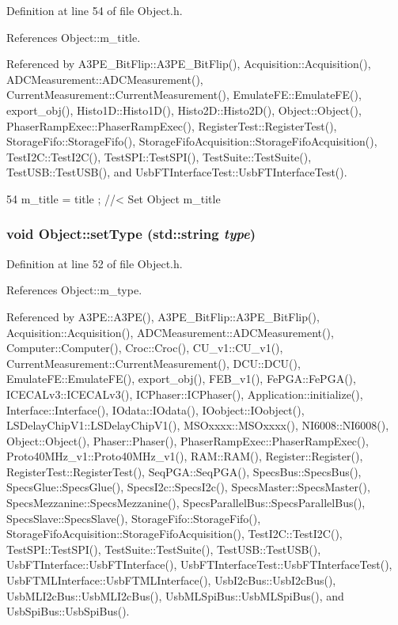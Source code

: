 Definition at line 54 of file Object.h.

References Object::m\_\-title.

Referenced by A3PE\_\-BitFlip::A3PE\_\-BitFlip(), Acquisition::Acquisition(), ADCMeasurement::ADCMeasurement(), CurrentMeasurement::CurrentMeasurement(), EmulateFE::EmulateFE(), export\_\-obj(), Histo1D::Histo1D(), Histo2D::Histo2D(), Object::Object(), PhaserRampExec::PhaserRampExec(), RegisterTest::RegisterTest(), StorageFifo::StorageFifo(), StorageFifoAcquisition::StorageFifoAcquisition(), TestI2C::TestI2C(), TestSPI::TestSPI(), TestSuite::TestSuite(), TestUSB::TestUSB(), and UsbFTInterfaceTest::UsbFTInterfaceTest().


\begin{DoxyCode}
54 { m_title = title ; } //< Set Object m_title
\end{DoxyCode}
\hypertarget{classObject_aae534cc9d982bcb9b99fd505f2e103a5}{
\subsubsection[{setType}]{\setlength{\rightskip}{0pt plus 5cm}void Object::setType (std::string {\em type})}}
\label{classObject_aae534cc9d982bcb9b99fd505f2e103a5}


Definition at line 52 of file Object.h.

References Object::m\_\-type.

Referenced by A3PE::A3PE(), A3PE\_\-BitFlip::A3PE\_\-BitFlip(), Acquisition::Acquisition(), ADCMeasurement::ADCMeasurement(), Computer::Computer(), Croc::Croc(), CU\_\-v1::CU\_\-v1(), CurrentMeasurement::CurrentMeasurement(), DCU::DCU(), EmulateFE::EmulateFE(), export\_\-obj(), FEB\_\-v1(), FePGA::FePGA(), ICECALv3::ICECALv3(), ICPhaser::ICPhaser(), Application::initialize(), Interface::Interface(), IOdata::IOdata(), IOobject::IOobject(), LSDelayChipV1::LSDelayChipV1(), MSOxxxx::MSOxxxx(), NI6008::NI6008(), Object::Object(), Phaser::Phaser(), PhaserRampExec::PhaserRampExec(), Proto40MHz\_\-v1::Proto40MHz\_\-v1(), RAM::RAM(), Register::Register(), RegisterTest::RegisterTest(), SeqPGA::SeqPGA(), SpecsBus::SpecsBus(), SpecsGlue::SpecsGlue(), SpecsI2c::SpecsI2c(), SpecsMaster::SpecsMaster(), SpecsMezzanine::SpecsMezzanine(), SpecsParallelBus::SpecsParallelBus(), SpecsSlave::SpecsSlave(), StorageFifo::StorageFifo(), StorageFifoAcquisition::StorageFifoAcquisition(), TestI2C::TestI2C(), TestSPI::TestSPI(), TestSuite::TestSuite(), TestUSB::TestUSB(), UsbFTInterface::UsbFTInterface(), UsbFTInterfaceTest::UsbFTInterfaceTest(), UsbFTMLInterface::UsbFTMLInterface(), UsbI2cBus::UsbI2cBus(), UsbMLI2cBus::UsbMLI2cBus(), UsbMLSpiBus::UsbMLSpiBus(), and UsbSpiBus::UsbSpiBus().


